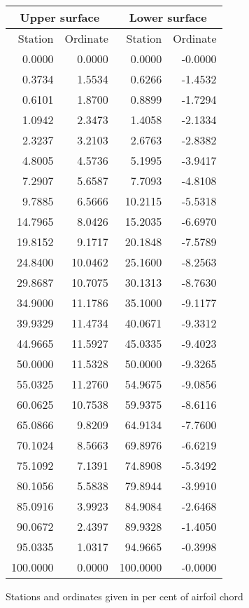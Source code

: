 \documentclass[11pt]{book}
\begin{document}
 \hspace{4mm}
 \begin{tabular}{|r|r|r|r|} \hline 
 \multicolumn{2}{|c|}{Upper surface} & \multicolumn{2}{|c|}{Lower surface} \\
 \hline
 Station & Ordinate & Station & Ordinate \\
 \hline
0.0000 & 0.0000 & 0.0000 & -0.0000 \\
0.3734 & 1.5534 & 0.6266 & -1.4532 \\
0.6101 & 1.8700 & 0.8899 & -1.7294 \\
1.0942 & 2.3473 & 1.4058 & -2.1334 \\
2.3237 & 3.2103 & 2.6763 & -2.8382 \\
4.8005 & 4.5736 & 5.1995 & -3.9417 \\
7.2907 & 5.6587 & 7.7093 & -4.8108 \\
9.7885 & 6.5666 & 10.2115 & -5.5318 \\
14.7965 & 8.0426 & 15.2035 & -6.6970 \\
19.8152 & 9.1717 & 20.1848 & -7.5789 \\
24.8400 & 10.0462 & 25.1600 & -8.2563 \\
29.8687 & 10.7075 & 30.1313 & -8.7630 \\
34.9000 & 11.1786 & 35.1000 & -9.1177 \\
39.9329 & 11.4734 & 40.0671 & -9.3312 \\
44.9665 & 11.5927 & 45.0335 & -9.4023 \\
50.0000 & 11.5328 & 50.0000 & -9.3265 \\
55.0325 & 11.2760 & 54.9675 & -9.0856 \\
60.0625 & 10.7538 & 59.9375 & -8.6116 \\
65.0866 & 9.8209 & 64.9134 & -7.7600 \\
70.1024 & 8.5663 & 69.8976 & -6.6219 \\
75.1092 & 7.1391 & 74.8908 & -5.3492 \\
80.1056 & 5.5838 & 79.8944 & -3.9910 \\
85.0916 & 3.9923 & 84.9084 & -2.6468 \\
90.0672 & 2.4397 & 89.9328 & -1.4050 \\
95.0335 & 1.0317 & 94.9665 & -0.3998 \\
100.0000 & 0.0000 & 100.0000 & -0.0000 \\
 \hline 
 \end{tabular}
 \vspace{8mm}

Stations and ordinates given in per cent of airfoil chord
\end{document}
